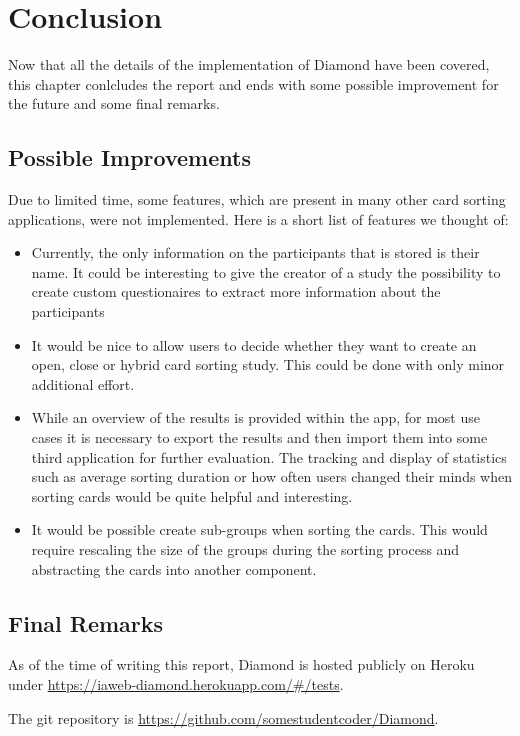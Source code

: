 \chapter{Conclusion}

\label{chap:Concl}

Now that all the details of the implementation of Diamond have been covered, this chapter conlcludes the report and ends with some possible improvement for the future and some final remarks.

\section{Possible Improvements}

Due to limited time, some features, which are present in many other card sorting applications, were not implemented. Here is a short list of features we thought of:

\begin{itemize}
  \item Currently, the only information on the participants that is stored is their name. It could be interesting to give the creator of a study the possibility to create custom questionaires to extract more information about the participants
  \item It would be nice to allow users to decide whether they want to create an open, close or hybrid card sorting study. This could be done with only minor additional effort. 
  \item While an overview of the results is provided within the app, for most use cases it is necessary to export the results and then import them into some third application for further evaluation. The tracking and display of statistics such as average sorting duration or how often users changed their minds when sorting cards would be quite helpful and interesting.
  \item It would be possible create sub-groups when sorting the cards. This would require rescaling the size of the groups during the sorting process and abstracting the cards into another component.
\end{itemize}



\section{Final Remarks}

As of the time of writing this report, Diamond is hosted publicly on Heroku under \url{https://iaweb-diamond.herokuapp.com/#/tests}.

The git repository is \url{https://github.com/somestudentcoder/Diamond}.


